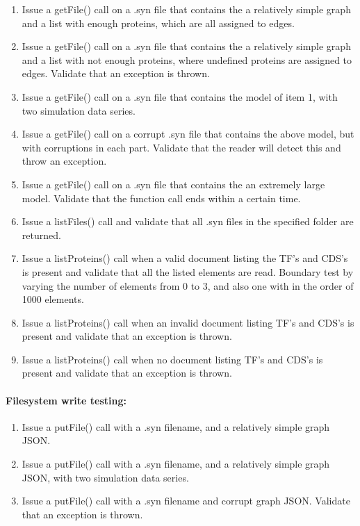 \begin{enumerate}
\item Issue a getFile() call on a .syn file that contains the a relatively simple graph  and a list with enough proteins, which are all assigned to edges.

\item Issue a getFile() call on a .syn file that contains the a relatively simple graph  and a list with not enough proteins, where undefined proteins are assigned to edges. Validate that an exception is thrown.\item Issue a getFile() call on  a .syn file that contains the  model of item 1, with two simulation data series.
\item Issue a getFile() call on  a corrupt .syn file that contains the above model, but with corruptions in each part.
Validate that the reader will detect this and throw an exception.
\item Issue a getFile() call on  a .syn file that contains the an extremely large model. Validate that the function call ends within a certain time. 
\item Issue a listFiles() call and validate that all .syn files in the specified folder are returned.

\item Issue a listProteins() call when a valid document listing the TF's and CDS's is present and validate that all the listed elements are read.
 Boundary test by varying the number of elements from 0 to 3, and also one with in the order of 1000 elements.\item Issue a listProteins() call when an  invalid document listing TF's and CDS's is present and validate that an exception is thrown.
\item Issue a listProteins() call when no document listing TF's and CDS's is present and validate that an exception is thrown.\end{enumerate}

\paragraph{Filesystem write testing:}

\begin{enumerate}
\item Issue a putFile() call with a .syn filename, and a relatively simple graph JSON.
\item  Issue a putFile() call with a .syn filename, and a  relatively simple graph JSON, with two simulation data series.
\item  Issue a putFile() call with a .syn filename and corrupt graph JSON. Validate that an exception is thrown. 
\end{enumerate}

